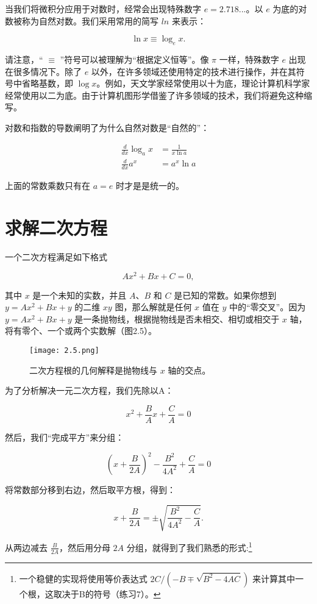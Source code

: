 \documentclass[lang=cn,12pt]{elegantbook}
\begin{document}
当我们将微积分应用于对数时，经常会出现特殊数字 $e=2.718...$。以 $e$ 为底的对数被称为自然对数。我们采用常用的简写 $ln$ 来表示：

$$\ln x \equiv \log_ex.$$

请注意，“ $\equiv$ ”符号可以被理解为“根据定义恒等”。像 $\pi$ 一样，特殊数字 $e$ 出现在很多情况下。除了 $e$ 以外，在许多领域还使用特定的技术进行操作，并在其符号中省略基数，即 $\log x$。例如，天文学家经常使用以十为底，理论计算机科学家经常使用以二为底。由于计算机图形学借鉴了许多领域的技术，我们将避免这种缩写。

对数和指数的导数阐明了为什么自然对数是“自然的”：


$$
\begin{aligned}
\frac{d}{d x} \log _{a} x &=\frac{1}{x \ln a} \\
\frac{d}{d x} a^{x} &=a^{x} \ln a
\end{aligned}
$$

上面的常数乘数只有在 $a = e$ 时才是是统一的。

\section{求解二次方程}

一个二次方程满足如下格式

$$Ax^2+Bx+C=0,$$

其中 $x$ 是一个未知的实数，并且 $A$、$B$ 和 $C$ 是已知的常数。如果你想到 $y=Ax^2+Bx+y$ 的二维 $xy$ 图，那么解就是任何 $x$ 值在 $y$ 中的“零交叉”。因为 $y=Ax^2+Bx+y$ 是一条抛物线，根据抛物线是否未相交、相切或相交于 $x$ 轴，将有零个、一个或两个实数解（图2.5）。

\begin{figure}[htbp]
\centering
\texttt{[image: 2.5.png]}
\caption{二次方程根的几何解释是抛物线与 $x$ 轴的交点。}
\end{figure}

为了分析解决一元二次方程，我们先除以A：

$$x^2+\frac{B}{A} x+\frac{C}{A}=0$$

然后，我们“完成平方”来分组：

$$\left(x+\frac{B}{2 A}\right)^{2}-\frac{B^{2}}{4 A^{2}}+\frac{C}{A}=0$$

将常数部分移到右边，然后取平方根，得到：

$$
x+\frac{B}{2 A}=\pm \sqrt{\frac{B^{2}}{4 A^{2}}-\frac{C}{A}} .
$$

从两边减去 $\frac{B}{2 A}$，然后用分母 $2A$ 分组，就得到了我们熟悉的形式:\footnote{一个稳健的实现将使用等价表达式 $2 C /\left(-B \mp \sqrt{B^{2}-4 A C}\right)$ 来计算其中一个根，这取决于B的符号（练习7）。}
\end{document}

